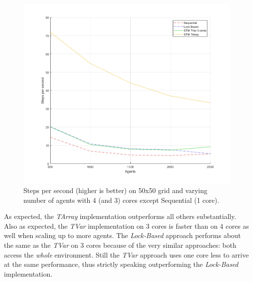 \begin{figure}
	\centering
	\includegraphics[width=1.0\textwidth, angle=0]{./fig/concurrentabs/sugarscape/varying_agents.png}
	\caption{Steps per second (higher is better) on 50x50 grid and varying number of agents with 4 (and 3) cores except Sequential (1 core).}
	\label{fig:state_results_agentsscale_time}
\end{figure}

As expected, the \textit{TArray} implementation outperforms all others substantially. Also as expected, the \textit{TVar} implementation on 3 cores is faster than on 4 cores as well when scaling up to more agents. The \textit{Lock-Based} approach performs about the same as the \textit{TVar} on 3 cores because of the very similar approaches: both access the \textit{whole} environment. Still the \textit{TVar} approach uses one core less to arrive at the same performance, thus strictly speaking outperforming the \textit{Lock-Based} implementation.

